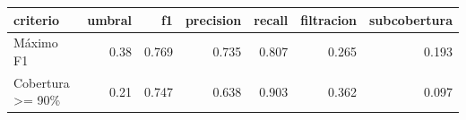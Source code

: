 
\begin{tabular}{lrrrrrr}
\toprule
criterio & umbral & f1 & precision & recall & filtracion & subcobertura\\
\midrule
Máximo F1 & 0.38 & 0.769 & 0.735 & 0.807 & 0.265 & 0.193\\
Cobertura >= 90\% & 0.21 & 0.747 & 0.638 & 0.903 & 0.362 & 0.097\\
\bottomrule
\end{tabular}

